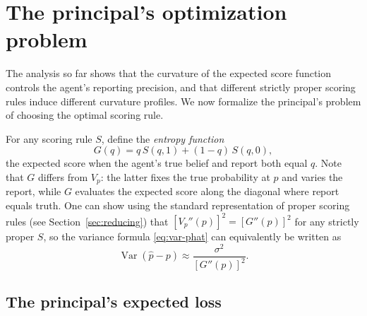 \documentclass[11pt]{article}
\begin{document}
\section{The principal's optimization problem}\label{sec:principal-opt}

The analysis so far shows that the curvature of the expected score function controls the agent's reporting precision, and that different strictly proper scoring rules induce different curvature profiles. We now formalize the principal's problem of choosing the optimal scoring rule.

For any scoring rule $S$, define the \emph{entropy function}
\begin{equation}\label{eq:entropy-def}
G(q) = q\,S(q, 1) + (1 - q)\,S(q, 0),
\end{equation}
the expected score when the agent's true belief and report both equal $q$. Note that $G$ differs from $V_p$: the latter fixes the true probability at $p$ and varies the report, while $G$ evaluates the expected score along the diagonal where report equals truth. One can show using the standard representation of proper scoring rules (see Section~\ref{sec:reducing}) that $[V_p''(p)]^2 = [G''(p)]^2$ for any strictly proper $S$, so the variance formula \eqref{eq:var-phat} can equivalently be written as
\begin{equation}\label{eq:var-G}
\operatorname{Var}(\hat{p} - p) \approx \frac{\sigma^2}{[G''(p)]^2}.
\end{equation}

\subsection{The principal's expected loss}
\end{document}
